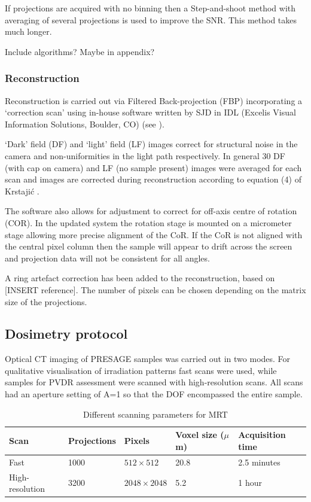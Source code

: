 If projections are acquired with no binning then a Step-and-shoot method with averaging of several projections is used to improve the SNR. This method takes much longer.

Include algorithms? Maybe in appendix?




\subsubsection{Reconstruction}
Reconstruction is carried out via Filtered Back-projection (FBP) incorporating a `correction scan' using in-house software  written by  SJD in IDL (Excelis Visual Information Solutions, Boulder, CO) (see \cite{doranestablishing2013}). 




`Dark' field (DF) and `light' field (LF) images correct for structural noise in the camera and non-uniformities in the light path respectively. In general 30 DF (with cap on camera) and LF (no sample present) images were averaged for each scan and images are corrected during reconstruction according to  equation (4) of Krstaji\'{c} \cite{Krstajic:2007ec}.  

The software also allows for adjustment to correct for off-axis  centre of rotation (COR). In the updated system  the rotation stage is mounted on a micrometer stage allowing more precise alignment of the CoR. If the CoR is not aligned with the central pixel column then the sample will appear to drift across the screen and projection data will not be consistent for all angles. \cite{Oldham:2006b}

A ring artefact correction has been added to the reconstruction, based on [INSERT reference]. The number of pixels can be chosen depending on the matrix size of the projections.


\subsection{Dosimetry protocol}


Optical CT imaging of PRESAGE samples was carried out in two modes.
For qualitative visualisation of irradiation patterns fast scans were used, while samples for PVDR assessment were scanned with high-resolution scans. All scans had an aperture setting of A=1 so that the DOF encompassed the entire sample.


		
	\begin{table}[H]
		\centering
		\begin{tabular}{ p{2.3cm}  p{2.5cm} p{2.5cm}  p{2.3cm} p{2.5cm}  }
			\hline
			\textbf{Scan} & \textbf{Projections} &\textbf{Pixels}   &\textbf{Voxel size ($\mu$m)} & \textbf{Acquisition time} \\ \hline 
			Fast  & 1000 & $512\times 512$  & 20.8 &2.5 minutes \\ %
			High-resolution & 3200 & $2048\times 2048$ &  5.2 & 1 hour \\ 
			\hline
		\end{tabular}
		\caption{Different scanning parameters for MRT}
		\label{table:scansettings}
	\end{table}
	
